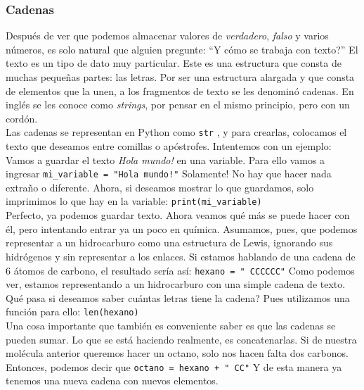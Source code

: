 \documentclass[10pt,letterpaper]{article}
\newcommand{\inlinecode}[1]{
\colorbox{light-gray}{\texttt{#1}}
}
\begin{document}
\subsubsection{Cadenas}
Despu\'es de ver que podemos almacenar valores de \emph{verdadero}, \emph{falso} y varios n\'umeros, es solo natural que alguien pregunte: ``Y c\'omo se trabaja con texto?'' El texto es un tipo de dato muy particular. Este es una estructura que consta de muchas peque\~nas partes: las letras. Por ser una estructura alargada y que consta de elementos que la unen, a los fragmentos de texto se les denomin\'o cadenas. En ingl\'es se les conoce como \emph{strings}, por pensar en el mismo principio, pero con un cord\'on.\\

Las cadenas se representan en Python como \inlinecode{str}, y para crearlas, colocamos el texto que deseamos entre comillas o ap\'ostrofes. Intentemos con un ejemplo: Vamos a guardar el texto \textit{Hola mundo!} en una variable. Para ello vamos a ingresar \inlinecode{mi\_variable = "Hola mundo!"} Solamente! No hay que hacer nada extra\~no o diferente. Ahora, si deseamos mostrar lo que guardamos, solo imprimimos lo que hay en la variable: \inlinecode{print(mi\_variable)}\\

Perfecto, ya podemos guardar texto. Ahora veamos qu\'e m\'as se puede hacer con \'el, pero intentando entrar ya un poco en qu\'imica. Asumamos, pues, que podemos representar a un hidrocarburo como una estructura de Lewis, ignorando sus hidr\'ogenos y sin representar a los enlaces. Si estamos hablando de una cadena de 6 \'atomos de carbono, el resultado ser\'ia as\'i: \inlinecode{hexano = "\ \hspace{-2mm}CCCCCC"} Como podemos ver, estamos representando a un hidrocarburo con una simple cadena de texto. Qu\'e pasa si deseamos saber cu\'antas letras tiene la cadena? Pues utilizamos una funci\'on para ello: \inlinecode{len(hexano)}\\

Una cosa importante que tambi\'en es conveniente saber es que las cadenas se pueden sumar. Lo que se est\'a haciendo realmente, es concatenarlas. Si de nuestra mol\'ecula anterior queremos hacer un octano, solo nos hacen falta dos carbonos. Entonces, podemos decir que \inlinecode{octano = hexano + "\ \hspace{-2mm}CC"} Y de esta manera ya tenemos una nueva cadena con nuevos elementos.\\
\end{document}
